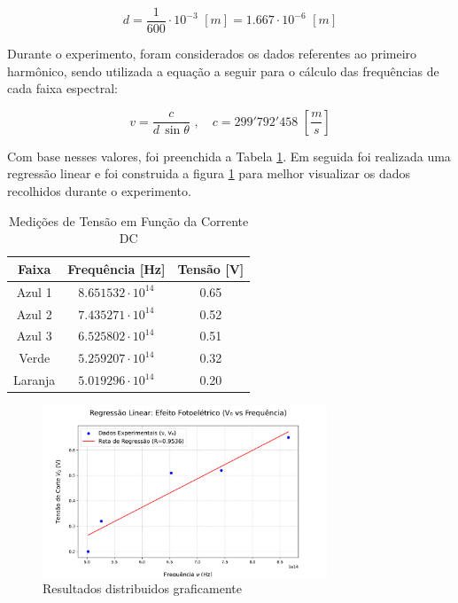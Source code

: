 \documentclass[10pt,twocolumn,letterpaper]{article}
\begin{document}
\vspace{-.5cm}

\begin{equation*}
    d = \frac{1}{600}\cdot10^{-3}\,\,[m] = 1.667 \cdot 10^{-6} \,\, [m]
\end{equation*}

\vspace{-.1cm}

\hspace{1cm} Durante o experimento, foram considerados os dados referentes ao primeiro harmônico, sendo utilizada a equação a seguir para o cálculo das frequências de cada faixa espectral:

\vspace{-.25cm}

\begin{equation*}
    v = \frac{c}{d\,\sin{\theta}}\,\,, \quad c = 299'792'458 \,\, \left[\frac{m}{s}\right]
\end{equation*}

\hspace{1cm} Com base nesses valores, foi preenchida a Tabela \ref{tab:medicoes_tensao2}. Em seguida foi realizada uma regressão linear e foi construida a figura \ref{fig:grafico} para melhor visualizar os dados recolhidos durante o experimento.

\begin{table}[htbp]
    \centering
    \caption{Medições de Tensão em Função da Corrente DC}
    \label{tab:medicoes_tensao2}
    \vspace{0.25cm}
    \begin{tabular}{ccc}
        \hline
        \rule{0pt}{3ex}\textbf{Faixa} & \textbf{Frequência} [Hz] & \textbf{Tensão} [V]\\[5pt]
        \hline
        \rule{0pt}{3ex}Azul 1 & $8.651532\cdot 10^{14}$ & 0.65 \\
        Azul 2 & $7.435271\cdot 10^{14}$ & 0.52 \\
        Azul 3 & $6.525802\cdot 10^{14}$ & 0.51 \\
        Verde & $5.259207\cdot 10^{14}$ & 0.32 \\
        Laranja & $5.019296\cdot 10^{14}$ & 0.20 \\[5pt]
        \hline
    \end{tabular}
\end{table}

\begin{figure}[h]
    \centering
    \includegraphics[width=8.5cm]{efeito_fotoeletrico_regressao.pdf}
    \caption{Resultados distribuidos graficamente}
    \label{fig:grafico}
\end{figure}
\end{document}
